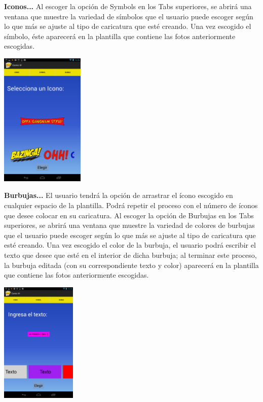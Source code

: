 \documentclass[12pt]{report}
\begin{document}
\begingroup
		\large{
			\textbf{
				Iconos...
				\newline
				\newline
			}
		}
	\endgroup
Al escoger la opción de Symbols en los Tabs superiores, se abrirá una ventana que muestre la variedad de símbolos que el usuario puede escoger según lo que más se ajuste al tipo de caricatura que esté creando. Una vez escogido el símbolo, éste aparecerá en la plantilla que contiene las fotos anteriormente escogidas.
	\begin{center}
		\begingroup
			\includegraphics[width=0.30\textwidth]{imagenes_usuario/iconos.png}
		\endgroup
	\end{center}


\begingroup
		\large{
			\textbf{
				Burbujas...
				\newline
				\newline
			}
		}
	\endgroup
El usuario tendrá la opción de arrastrar el ícono escogido en cualquier espacio de la plantilla. Podrá repetir el proceso con el número de íconos que desee colocar en su caricatura.
Al escoger la opción de Burbujas en los Tabs superiores, se abrirá una ventana que muestre la variedad de colores de burbujas que el usuario puede escoger según lo que más se ajuste al tipo de caricatura que esté creando. Una vez escogido el color de la burbuja, el usuario podrá escribir el texto que desee que esté en el interior de dicha burbuja; al terminar este proceso, la burbuja editada (con su correspondiente texto y color) aparecerá en la plantilla que contiene las fotos anteriormente escogidas.

	\begin{center}
		\begingroup
			\includegraphics[width=0.27\textwidth]{imagenes_usuario/texto.png}
		\endgroup
	\end{center}
\end{document}
